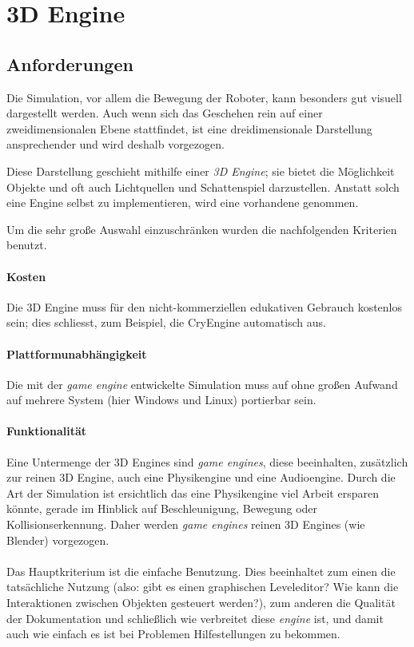 \documentclass[
    12pt,
    bibliography=totoc,
    ngerman,
    enabledeprecatedfontcommands
]{scrartcl}
\begin{document}
\clearpage
\section{3D Engine}
\subsection{Anforderungen}
Die Simulation, vor allem die Bewegung der Roboter, kann besonders gut visuell dargestellt werden. Auch wenn sich das Geschehen rein auf einer zweidimensionalen Ebene stattfindet, ist eine dreidimensionale
Darstellung ansprechender und wird deshalb vorgezogen.

Diese Darstellung geschieht mithilfe einer \textit{3D Engine}; sie bietet die M{\"{o}}glichkeit Objekte und oft auch Lichtquellen und Schattenspiel darzustellen.
Anstatt solch eine Engine selbst zu implementieren, wird eine vorhandene genommen.

Um die sehr gro{\ss}e Auswahl einzuschr{\"{a}}nken wurden die nachfolgenden Kriterien benutzt.

\paragraph{Kosten} Die 3D Engine muss f{\"{u}}r den nicht-kommerziellen edukativen Gebrauch kostenlos sein; dies schliesst, zum Beispiel, die CryEngine\cite{cryengine} automatisch aus.

\paragraph{Plattformunabh{\"{a}}ngigkeit} Die mit der \textit{game engine} entwickelte Simulation muss auf ohne gro{\ss}en Aufwand auf mehrere System (hier Windows und Linux) portierbar sein.

\paragraph{Funktionalit{\"{a}}t} Eine Untermenge der 3D Engines sind \textit{game engines}, diese beeinhalten, zus{\"{a}}tzlich zur reinen 3D Engine, auch eine Physikengine und eine Audioengine.
Durch die Art der Simulation ist ersichtlich das eine Physikengine viel Arbeit ersparen k{\"{o}}nnte, gerade im Hinblick auf Beschleunigung, Bewegung oder Kollisionserkennung. Daher werden \textit{game engines} reinen 3D Engines (wie Blender) vorgezogen.

\paragraph{} Das Hauptkriterium ist die einfache Benutzung. Dies beeinhaltet zum einen die
tats{\"{a}}chliche Nutzung (also: gibt es einen graphischen Leveleditor? Wie kann die Interaktionen zwischen
Objekten gesteuert werden?), zum anderen die Qualit{\"{a}}t der Dokumentation und schließlich wie verbreitet diese
\textit{engine} ist, und damit auch wie einfach es ist bei Problemen Hilfestellungen zu bekommen.
\end{document}
